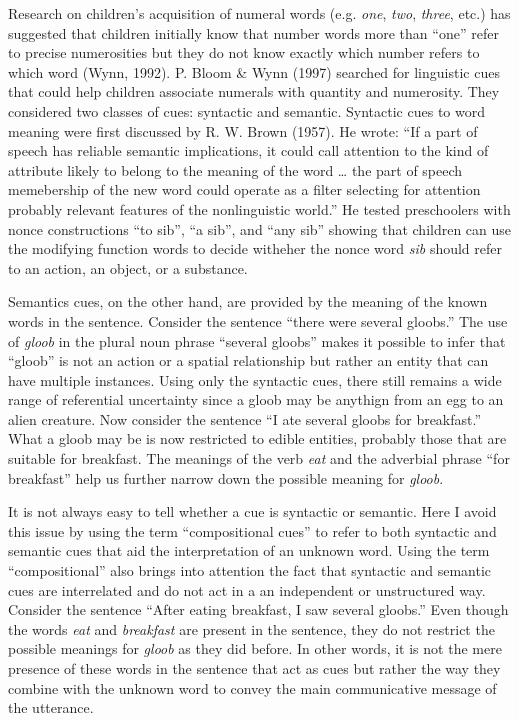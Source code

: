 \documentclass[oneside]{report}
\theoremstyle{definition}
\theoremstyle{definition}
\theoremstyle{definition}
\theoremstyle{remark}
\begin{document}
Research on children's acquisition of numeral words (e.g. \emph{one},
\emph{two}, \emph{three}, etc.) has suggested that children initially
know that number words more than ``one'' refer to precise numerosities
but they do not know exactly which number refers to which word (Wynn,
1992). P. Bloom \& Wynn (1997) searched for linguistic cues that could
help children associate numerals with quantity and numerosity. They
considered two classes of cues: syntactic and semantic. Syntactic cues
to word meaning were first discussed by R. W. Brown (1957). He wrote:
``If a part of speech has reliable semantic implications, it could call
attention to the kind of attribute likely to belong to the meaning of
the word \ldots{} the part of speech memebership of the new word could
operate as a filter selecting for attention probably relevant features
of the nonlinguistic world.'' He tested preschoolers with nonce
constructions ``to sib'', ``a sib'', and ``any sib'' showing that
children can use the modifying function words to decide witheher the
nonce word \emph{sib} should refer to an action, an object, or a
substance.

Semantics cues, on the other hand, are provided by the meaning of the
known words in the sentence. Consider the sentence ``there were several
gloobs.'' The use of \emph{gloob} in the plural noun phrase ``several
gloobs'' makes it possible to infer that ``gloob'' is not an action or a
spatial relationship but rather an entity that can have multiple
instances. Using only the syntactic cues, there still remains a wide
range of referential uncertainty since a gloob may be anythign from an
egg to an alien creature. Now consider the sentence ``I ate several
gloobs for breakfast.'' What a gloob may be is now restricted to edible
entities, probably those that are suitable for breakfast. The meanings
of the verb \emph{eat} and the adverbial phrase ``for breakfast'' help
us further narrow down the possible meaning for \emph{gloob}.

It is not always easy to tell whether a cue is syntactic or semantic.
Here I avoid this issue by using the term ``compositional cues'' to
refer to both syntactic and semantic cues that aid the interpretation of
an unknown word. Using the term ``compositional'' also brings into
attention the fact that syntactic and semantic cues are interrelated and
do not act in a an independent or unstructured way. Consider the
sentence ``After eating breakfast, I saw several gloobs.'' Even though
the words \emph{eat} and \emph{breakfast} are present in the sentence,
they do not restrict the possible meanings for \emph{gloob} as they did
before. In other words, it is not the mere presence of these words in
the sentence that act as cues but rather the way they combine with the
unknown word to convey the main communicative message of the utterance.
\end{document}
